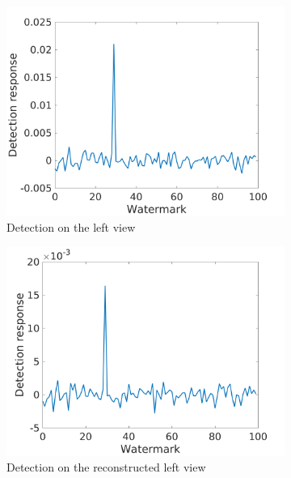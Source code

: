\begin{figure}[h!]
\centering
\begin{subfigure}[t]{0.5\textwidth}
\centering
\includegraphics[width=1\textwidth]{./img/corr_gauss/left_corr_value_3.png}
  \caption{\small{Detection on the left view}\label{fig:gl3}}
\end{subfigure}%
\begin{subfigure}[t]{0.5\textwidth}
\centering
\includegraphics[width=1\textwidth]{./img/corr_gauss/right_warpedwat_corr_value_3.png}
\caption{\small{Detection on the reconstructed left view}\label{fig:grw3}}
\end{subfigure}
\begin{subfigure}[t]{0.5\textwidth}
\centering

\end{subfigure}
\end{figure}
